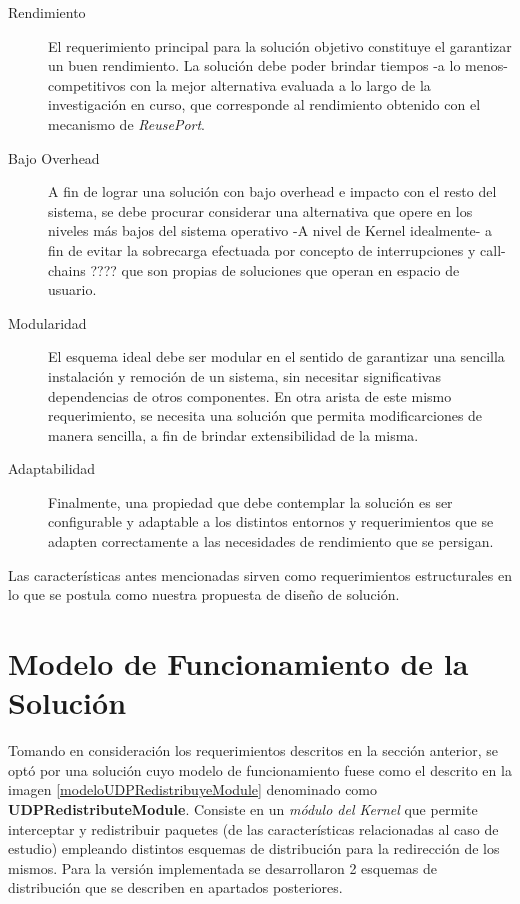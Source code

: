 \begin{description}
\item[Rendimiento] El requerimiento principal para la solución objetivo constituye el garantizar un buen rendimiento. La solución debe poder brindar tiempos -a lo menos- competitivos con la mejor alternativa evaluada a lo largo de la investigación en curso, que corresponde al rendimiento obtenido con el mecanismo de \emph{ReusePort}.
\item[Bajo Overhead] A fin de lograr una solución con bajo overhead e impacto con el resto del sistema, se debe procurar considerar una alternativa que opere en los niveles más bajos del sistema operativo -A nivel de Kernel idealmente- a fin de evitar la sobrecarga efectuada por concepto de interrupciones y call-chains ???? que son propias de soluciones que operan en espacio de usuario.
\item[Modularidad] El esquema ideal debe ser modular en el sentido de garantizar una sencilla instalación y remoción de un sistema, sin necesitar significativas dependencias de otros componentes. En otra arista de este mismo requerimiento, se necesita una solución que permita modificarciones de manera sencilla, a fin de brindar extensibilidad de la misma.
\item[Adaptabilidad] Finalmente, una propiedad que debe contemplar la solución es ser configurable y adaptable a los distintos entornos y requerimientos que se adapten correctamente a las necesidades de rendimiento que se persigan.
\end{description}

Las características antes mencionadas sirven como requerimientos estructurales en lo que se postula como nuestra propuesta de diseño de solución.

\section{Modelo de Funcionamiento de la Solución}
Tomando en consideración los requerimientos descritos en la sección anterior, se optó por una solución cuyo modelo de funcionamiento fuese como el descrito en la imagen \ref{modeloUDPRedistribuyeModule} denominado como \textbf{UDPRedistributeModule}. Consiste en un \emph{módulo del Kernel} que permite interceptar y redistribuir paquetes (de las características relacionadas al caso de estudio) empleando distintos esquemas de distribución para la redirección de los mismos. Para la versión implementada se desarrollaron 2 esquemas de distribución que se describen en apartados posteriores.

